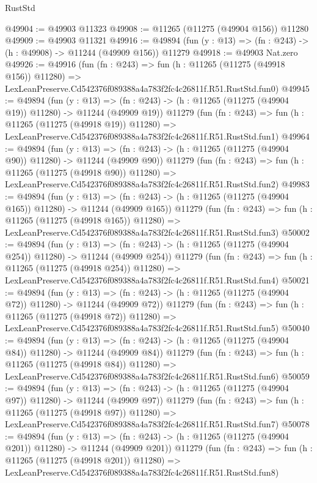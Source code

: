 \begin{lexlean}{RustStd}
\begin{coremodule}
@49904 := @49903 @11323
@49908 := @11265 (@11275 (@49904 @156)) @11280
@49909 := @49903 @11321
@49916 := @49894 (fun (y : @13) => (fn : @243) -> (h : @49908) -> @11244 (@49909 @156)) @11279
@49918 := @49903 Nat.zero
@49926 := @49916
    (fun (fn : @243) =>
    fun (h : @11265 (@11275 (@49918 @156)) @11280) =>
    LexLeanPreserve.Cd542376f089388a4a783f2fc4c26811f.R51.RustStd.fun0)
@49945 := @49894
    (fun (y : @13) =>
    (fn : @243) -> (h : @11265 (@11275 (@49904 @19)) @11280) -> @11244 (@49909 @19))
    @11279
    (fun (fn : @243) =>
    fun (h : @11265 (@11275 (@49918 @19)) @11280) =>
    LexLeanPreserve.Cd542376f089388a4a783f2fc4c26811f.R51.RustStd.fun1)
@49964 := @49894
    (fun (y : @13) =>
    (fn : @243) -> (h : @11265 (@11275 (@49904 @90)) @11280) -> @11244 (@49909 @90))
    @11279
    (fun (fn : @243) =>
    fun (h : @11265 (@11275 (@49918 @90)) @11280) =>
    LexLeanPreserve.Cd542376f089388a4a783f2fc4c26811f.R51.RustStd.fun2)
@49983 := @49894
    (fun (y : @13) =>
    (fn : @243) -> (h : @11265 (@11275 (@49904 @165)) @11280) -> @11244 (@49909 @165))
    @11279
    (fun (fn : @243) =>
    fun (h : @11265 (@11275 (@49918 @165)) @11280) =>
    LexLeanPreserve.Cd542376f089388a4a783f2fc4c26811f.R51.RustStd.fun3)
@50002 := @49894
    (fun (y : @13) =>
    (fn : @243) -> (h : @11265 (@11275 (@49904 @254)) @11280) -> @11244 (@49909 @254))
    @11279
    (fun (fn : @243) =>
    fun (h : @11265 (@11275 (@49918 @254)) @11280) =>
    LexLeanPreserve.Cd542376f089388a4a783f2fc4c26811f.R51.RustStd.fun4)
@50021 := @49894
    (fun (y : @13) =>
    (fn : @243) -> (h : @11265 (@11275 (@49904 @72)) @11280) -> @11244 (@49909 @72))
    @11279
    (fun (fn : @243) =>
    fun (h : @11265 (@11275 (@49918 @72)) @11280) =>
    LexLeanPreserve.Cd542376f089388a4a783f2fc4c26811f.R51.RustStd.fun5)
@50040 := @49894
    (fun (y : @13) =>
    (fn : @243) -> (h : @11265 (@11275 (@49904 @84)) @11280) -> @11244 (@49909 @84))
    @11279
    (fun (fn : @243) =>
    fun (h : @11265 (@11275 (@49918 @84)) @11280) =>
    LexLeanPreserve.Cd542376f089388a4a783f2fc4c26811f.R51.RustStd.fun6)
@50059 := @49894
    (fun (y : @13) =>
    (fn : @243) -> (h : @11265 (@11275 (@49904 @97)) @11280) -> @11244 (@49909 @97))
    @11279
    (fun (fn : @243) =>
    fun (h : @11265 (@11275 (@49918 @97)) @11280) =>
    LexLeanPreserve.Cd542376f089388a4a783f2fc4c26811f.R51.RustStd.fun7)
@50078 := @49894
    (fun (y : @13) =>
    (fn : @243) -> (h : @11265 (@11275 (@49904 @201)) @11280) -> @11244 (@49909 @201))
    @11279
    (fun (fn : @243) =>
    fun (h : @11265 (@11275 (@49918 @201)) @11280) =>
    LexLeanPreserve.Cd542376f089388a4a783f2fc4c26811f.R51.RustStd.fun8)

\end{coremodule}
\end{lexlean}
